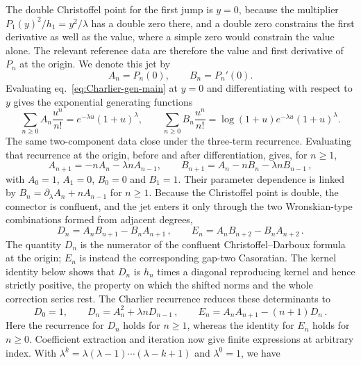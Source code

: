 \documentclass[a4paper,11pt]{article}
\def\ee{e}%
\theoremstyle{definition}
\theoremstyle{remark}
\newcommand{\ee}{\mathrm e}
\begin{document}
The double Christoffel point for the first jump is $y=0$, because the multiplier $P_1(y)^2/h_1=y^2/\lambda$ has a double zero there, and a double zero constrains the first derivative as well as the value, where a simple zero would constrain the value alone. The relevant reference data are therefore the value and first derivative of $P_n$ at the origin. We denote this jet by
\begin{equation}
   A_n=P_n(0),
   \qquad
   B_n=P_n'(0).
\end{equation}
Evaluating eq.~\eqref{eq:Charlier-gen-main} at $y=0$ and differentiating with respect to $y$ gives the exponential generating functions
\begin{equation}
   \sum_{n\ge0}A_n\frac{u^n}{n!}=\ee^{-\lambda u}(1+u)^\lambda,
   \qquad
   \sum_{n\ge0}B_n\frac{u^n}{n!}=\log(1+u)\ee^{-\lambda u}(1+u)^\lambda.
   \label{eq:AB-gen-app}
\end{equation}
The same two-component data close under the three-term recurrence. Evaluating that recurrence at the origin, before and after differentiation, gives, for $n\ge1$,
\begin{equation}
   A_{n+1}=-nA_n-\lambda nA_{n-1},
   \qquad
   B_{n+1}=A_n-nB_n-\lambda nB_{n-1}\,,
   \label{eq:AB-rec-app}
\end{equation}
with $A_0=1$, $A_1=0$, $B_0=0$ and $B_1=1$. Their parameter dependence is linked by $B_n=\partial_\lambda A_n+nA_{n-1}$ for $n\ge1$. Because the Christoffel point is double, the connector is confluent, and the jet enters it only through the two Wronskian-type combinations formed from adjacent degrees, 
\begin{equation}
   D_n=A_nB_{n+1}-B_nA_{n+1}\,,
   \qquad
   E_n=A_nB_{n+2}-B_nA_{n+2}\,.
\end{equation}
The quantity $D_n$ is the numerator of the confluent Christoffel--Darboux formula at the origin; $E_n$ is instead the corresponding gap-two Casoratian. The kernel identity below shows that $D_n$ is $h_n$ times a diagonal reproducing kernel and hence strictly positive, the property
on which the shifted norms and the whole correction series rest.
The Charlier recurrence reduces these determinants to
\begin{equation}
   D_0=1,
   \qquad
   D_n=A_n^2+\lambda nD_{n-1}\,,
   \qquad
   E_n=A_nA_{n+1}-(n+1)D_n\,.
   \label{eq:DE-app}
\end{equation}
Here the recurrence for $D_n$ holds for $n\ge1$, whereas the identity for $E_n$ holds for $n\ge0$. Coefficient extraction and iteration now give finite expressions at arbitrary index. With $\lambda^{\underline{k}}=\lambda(\lambda-1)\cdots(\lambda-k+1)$ and $\lambda^{\underline{0}}=1$, we have
\end{document}

